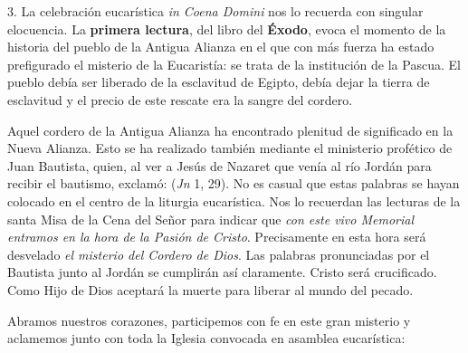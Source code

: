 \begin{body}
3. La celebración eucarística \textit{in Coena Domini} nos lo recuerda con singular elocuencia. La \textbf{primera lectura}, del libro del \textbf{Éxodo}, evoca el momento de la historia del pueblo de la Antigua Alianza en el que con más fuerza ha estado prefigurado el misterio de la Eucaristía: se trata de la institución de la Pascua. El pueblo debía ser liberado de la esclavitud de Egipto, debía dejar la tierra de esclavitud y el precio de este rescate era la sangre del cordero.

Aquel cordero de la Antigua Alianza ha encontrado plenitud de significado en la Nueva Alianza. Esto se ha realizado también mediante el ministerio profético de Juan Bautista, quien, al ver a Jesús de Nazaret que venía al río Jordán para recibir el bautismo, exclamó:  (\textit{Jn} 1, 29). No es casual que estas palabras se hayan colocado en el centro de la liturgia eucarística. Nos lo recuerdan las lecturas de la santa Misa de la Cena del Señor para indicar que \textit{con este vivo Memorial entramos en la hora de la Pasión de Cristo}. Precisamente en esta hora será desvelado \textit{el misterio del Cordero de Dios}. Las palabras pronunciadas por el Bautista junto al Jordán se cumplirán así claramente. Cristo será crucificado. Como Hijo de Dios aceptará la muerte para liberar al mundo del pecado.

Abramos nuestros corazones, participemos con fe en este gran misterio y aclamemos junto con toda la Iglesia convocada en asamblea eucarística: 
\end{body}

\label{b-05-01-1997H}

